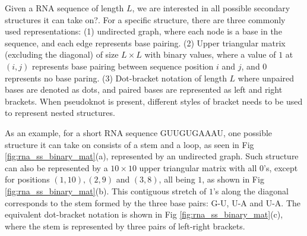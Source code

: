 \documentclass{article}
\begin{document}
Given a RNA sequence of length $L$, we are interested in all possible secondary structures it can take on?.
For a specific structure, there are three commonly used representations:
(1) undirected graph, where each node is a base in the sequence, and each edge represents base pairing.
(2) Upper triangular matrix (excluding the diagonal)
of size $L \times L$ with binary values, where a value of $1$ at $(i, j)$ represents
base pairing between sequence position $i$ and $j$, and $0$ represents no base paring.
(3) Dot-bracket notation of length $L$ where unpaired bases are denoted as dots,
    and paired bases are represented as left and right brackets.
When pseudoknot is present, different styles of bracket needs to be used to represent nested structures.


%
%
%
%

As an example, for a short RNA sequence GUUGUGAAAU, one possible structure it can take on
consists of a stem and a loop, as seen in Fig \ref{fig:rna_ss_binary_mat}(a), represented by an undirected graph.
Such structure can also be represented by a $10 \times 10$ upper triangular matrix with all $0$'s,
except for positions
$(1, 10), (2, 9)$ and $(3, 8)$,
all being $1$, as shown in Fig \ref{fig:rna_ss_binary_mat}(b).
This contiguous stretch of $1$'s along the diagonal corresponds to the stem formed by the three base pairs: G-U, U-A and U-A.
The equivalent dot-bracket notation is shown in Fig \ref{fig:rna_ss_binary_mat}(c), where the stem is represented
by three pairs of left-right brackets.
\end{document}
